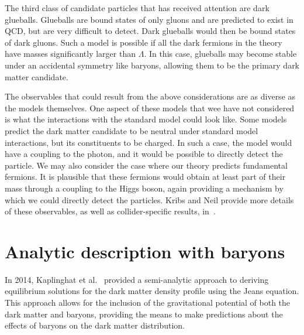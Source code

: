 The third class of candidate particles that has received attention are dark
glueballs. Glueballs are bound states of only gluons and are predicted to
exist in QCD, but are very difficult to detect. Dark glueballs would then be
bound states of dark gluons. Such a model is possible if all the dark fermions
in the theory have masses significantly larger than \(\Lambda\). In this case,
glueballs may become stable under an accidental symmetry like baryons,
allowing them to be the primary dark matter candidate.

The observables that could result from the above considerations are as diverse
as the models themselves. One aspect of these models that wee have not
considered is what the interactions with the standard model could look like.
Some models predict the dark matter candidate to be neutral under standard
model interactions, but its constituents to be charged. In such a case, the
model would have a coupling to the photon, and it would be possible to
directly detect the particle. We may also consider the case where our theory
predicts fundamental fermions. It is plausible that these fermions would
obtain at least part of their mass through a coupling to the Higgs boson,
again providing a mechanism by which we could directly detect the particles.
Kribs and Neil provide more details of these observables, as well as
collider-specific results, in~\cite{kribs_review_2016}.

\hypertarget{analytic-description-with-baryons}{%
\section{Analytic description with baryons}\label{analytic-description-with-baryons}}

In 2014, Kaplinghat et al.~\cite{kaplinghat_tying_2014} provided a
semi-analytic approach to deriving equilibrium solutions for the dark matter
density profile using the Jeans equation. This approach allows for the
inclusion of the gravitational potential of both the dark matter and baryons,
providing the means to make predictions about the effects of baryons on the
dark matter distribution.

